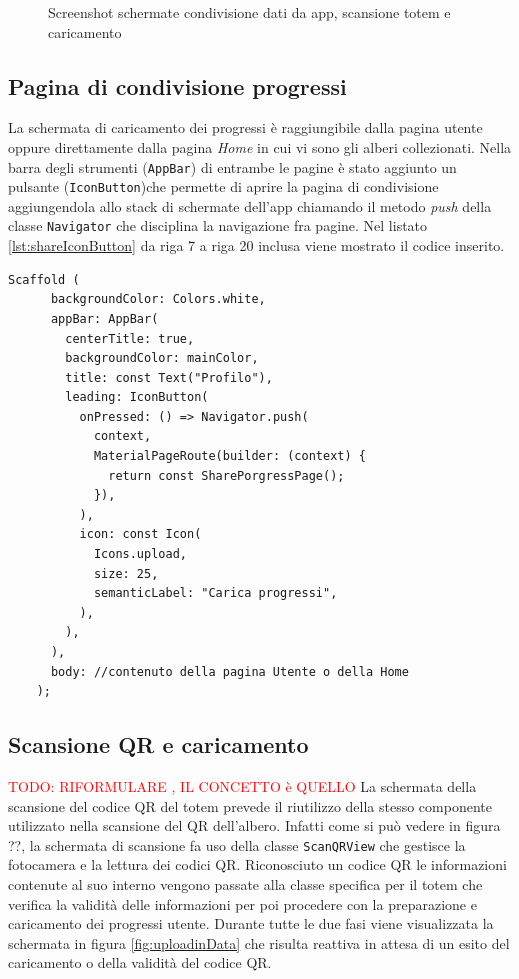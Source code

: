 \begin{figure}[h!]
{        \label{fig:uploadinData}
    } 
    \caption{Screenshot schermate condivisione dati da app, scansione totem e caricamento}
    \label{fig:shareDataApp}
\end{figure}

\subsection{Pagina di condivisione progressi}
La schermata di caricamento dei progressi è raggiungibile dalla pagina utente oppure direttamente dalla pagina \textit{Home} in cui vi sono gli alberi collezionati. Nella barra degli strumenti (\texttt{AppBar}) di entrambe le pagine è stato aggiunto un pulsante (\texttt{IconButton})che permette di aprire la pagina di condivisione aggiungendola allo stack di schermate dell'app chiamando il metodo \textit{push} della classe \texttt{Navigator} che disciplina la navigazione fra pagine. Nel listato \ref{lst:shareIconButton} da riga 7 a riga 20 inclusa viene mostrato il codice inserito.

\begin{lstlisting}[style=FlutterStyle, caption={Codice aggiornato della barra degli strumenti dell'app: inserito pulsante per la condivisione dei progressi.}, label={lst:shareIconButton}]
    Scaffold (
      backgroundColor: Colors.white,
      appBar: AppBar(
        centerTitle: true,
        backgroundColor: mainColor, 
        title: const Text("Profilo"),
        leading: IconButton(
          onPressed: () => Navigator.push(
            context,
            MaterialPageRoute(builder: (context) {
              return const SharePorgressPage();
            }),
          ),
          icon: const Icon(
            Icons.upload,
            size: 25,
            semanticLabel: "Carica progressi",
          ),
        ),
      ),
      body: //contenuto della pagina Utente o della Home
    );
\end{lstlisting}

\subsection{Scansione QR e caricamento}
\textcolor{red}{TODO: RIFORMULARE , IL CONCETTO è QUELLO}
La schermata della scansione del codice QR del totem prevede il riutilizzo della stesso componente utilizzato nella scansione del QR dell'albero. Infatti come si può vedere in figura ??, la schermata di scansione fa uso della classe \texttt{ScanQRView} che gestisce la fotocamera e la lettura dei codici QR. Riconosciuto un codice QR le informazioni contenute al suo interno vengono passate alla classe specifica per il totem che verifica la validità delle informazioni per poi procedere con la preparazione e caricamento dei progressi utente. Durante tutte le due fasi viene visualizzata la schermata in figura \ref{fig:uploadinData} che risulta reattiva in attesa di un esito del caricamento o della validità del codice QR.

